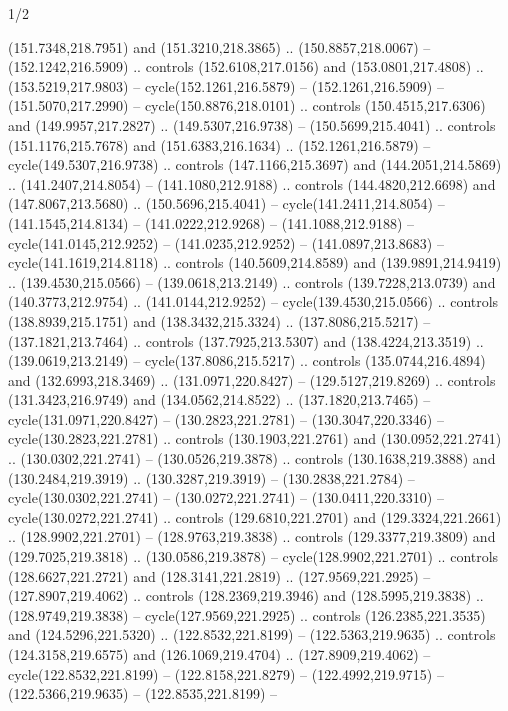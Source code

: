 \begin{flagdescription}{1/2}
\begin{scope}[shift={(0.26984,0.5)},scale=1/2.54]
\begin{scope}[scale=\flagwidth/550]
\begin{scope}
  (151.7348,218.7951) and (151.3210,218.3865) .. (150.8857,218.0067) --
  (152.1242,216.5909) .. controls (152.6108,217.0156) and (153.0801,217.4808) ..
  (153.5219,217.9803) -- cycle(152.1261,216.5879) -- (152.1261,216.5909) --
  (151.5070,217.2990) -- cycle(150.8876,218.0101) .. controls
  (150.4515,217.6306) and (149.9957,217.2827) .. (149.5307,216.9738) --
  (150.5699,215.4041) .. controls (151.1176,215.7678) and (151.6383,216.1634) ..
  (152.1261,216.5879) -- cycle(149.5307,216.9738) .. controls
  (147.1166,215.3697) and (144.2051,214.5869) .. (141.2407,214.8054) --
  (141.1080,212.9188) .. controls (144.4820,212.6698) and (147.8067,213.5680) ..
  (150.5696,215.4041) -- cycle(141.2411,214.8054) -- (141.1545,214.8134) --
  (141.0222,212.9268) -- (141.1088,212.9188) -- cycle(141.0145,212.9252) --
  (141.0235,212.9252) -- (141.0897,213.8683) -- cycle(141.1619,214.8118) ..
  controls (140.5609,214.8589) and (139.9891,214.9419) .. (139.4530,215.0566) --
  (139.0618,213.2149) .. controls (139.7228,213.0739) and (140.3773,212.9754) ..
  (141.0144,212.9252) -- cycle(139.4530,215.0566) .. controls
  (138.8939,215.1751) and (138.3432,215.3324) .. (137.8086,215.5217) --
  (137.1821,213.7464) .. controls (137.7925,213.5307) and (138.4224,213.3519) ..
  (139.0619,213.2149) -- cycle(137.8086,215.5217) .. controls
  (135.0744,216.4894) and (132.6993,218.3469) .. (131.0971,220.8427) --
  (129.5127,219.8269) .. controls (131.3423,216.9749) and (134.0562,214.8522) ..
  (137.1820,213.7465) -- cycle(131.0971,220.8427) -- (130.2823,221.2781) --
  (130.3047,220.3346) -- cycle(130.2823,221.2781) .. controls
  (130.1903,221.2761) and (130.0952,221.2741) .. (130.0302,221.2741) --
  (130.0526,219.3878) .. controls (130.1638,219.3888) and (130.2484,219.3919) ..
  (130.3287,219.3919) -- (130.2838,221.2784) -- cycle(130.0302,221.2741) --
  (130.0272,221.2741) -- (130.0411,220.3310) -- cycle(130.0272,221.2741) ..
  controls (129.6810,221.2701) and (129.3324,221.2661) .. (128.9902,221.2701) --
  (128.9763,219.3838) .. controls (129.3377,219.3809) and (129.7025,219.3818) ..
  (130.0586,219.3878) -- cycle(128.9902,221.2701) .. controls
  (128.6627,221.2721) and (128.3141,221.2819) .. (127.9569,221.2925) --
  (127.8907,219.4062) .. controls (128.2369,219.3946) and (128.5995,219.3838) ..
  (128.9749,219.3838) -- cycle(127.9569,221.2925) .. controls
  (126.2385,221.3535) and (124.5296,221.5320) .. (122.8532,221.8199) --
  (122.5363,219.9635) .. controls (124.3158,219.6575) and (126.1069,219.4704) ..
  (127.8909,219.4062) -- cycle(122.8532,221.8199) -- (122.8158,221.8279) --
  (122.4992,219.9715) -- (122.5366,219.9635) -- (122.8535,221.8199) --

\end{scope}
\end{scope}
\end{scope}
\end{flagdescription}
